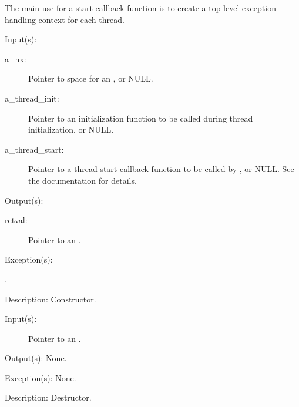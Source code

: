\begin{capi}
\begin{capilist}
		The main use for a start callback function is to create a top
		level  exception handling context for each
		thread.
	\end{capilist}
\label{nx_new}
	\begin{capilist}
	\item[Input(s): ]
		\begin{description}\item[]
		\item[a\_nx: ]
			Pointer to space for an , or NULL.
		\item[a\_thread\_init: ]
			Pointer to an initialization function to be called
			during thread initialization, or NULL.
		\item[a\_thread\_start: ]
			Pointer to a thread start callback function to be called
			by , or NULL.  See the
			 documentation for details.
		\end{description}
	\item[Output(s): ]
		\begin{description}\item[]
		\item[retval: ]
			Pointer to an .
		\end{description}
	\item[Exception(s): ]
		\begin{description}\item[]
		\item[.]
		\end{description}
	\item[Description: ]
		Constructor.
	\end{capilist}
\label{nx_delete}
	\begin{capilist}
	\item[Input(s): ]
		\begin{description}\item[]
			Pointer to an \classname{nx}.
		\end{description}
	\item[Output(s): ] None.
	\item[Exception(s): ] None.
	\item[Description: ]
		Destructor.
	\end{capilist}

\end{capi}
